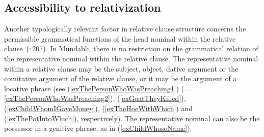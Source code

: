 \documentclass[10pt,twoside]{article}
\newcommand{\gl}[1]{`#1'}
\def\VSP{\vspace{0pt}}
\newcommand{\cl}[1]{{\sc cl#1}}
\newcommand{\citepp}[2]{(\citealp{#1}:\,{#2})}
\newcommand{\pref}[1]{(\ref{#1})}
\begin{document}
%
%
%
%
%

\subsection{Accessibility to relativization}\label{secMundabliAccessibility}

Another typologically relevant factor in relative clause structure concerns the permissible
grammatical functions of the head nominal within the relative clause~\citepp{andrews:2007}{207}. 
In Mundabli, there is no restriction on the grammatical relation of the representative nominal within the relative 
clause. The representative nominal within a relative clause may be the subject, object, dative argument or 
the comitative argument of the relative clause, or it may be the argument of a locative phrase 
(see \pref{exThePersonWhoWasPreaching1} (=\ref{exThePersonWhoWasPreaching2}), \pref{exGoatTheyKilled}, 
\pref{exChildWhomIGaveMoney}, \pref{exTheHoeWithWhich} and \pref{exThePotIntoWhich}, respectively). The representative 
nominal can also be the possessor in a genitive phrase, as in \pref{exChildWhoseName}.
\end{document}
